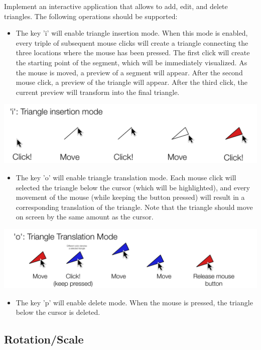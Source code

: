 \documentclass[11pt]{article}
\begin{document}
Implement an interactive application that allows to add, edit, and delete triangles. The following operations should be supported:
\begin{itemize}
	\item The key 'i' will enable triangle insertion mode. When this mode is enabled, every triple of subsequent mouse clicks will create a triangle connecting the three locations where the mouse has been pressed. The first click will create the starting point of the segment, which will be immediately visualized. As the mouse is moved, a preview of a segment will appear. After the second mouse click, a preview of the triangle will appear. After the third click, the current preview will transform into the final triangle. 
\end{itemize}
\includegraphics[width=1\textwidth]{i.pdf}
\begin{itemize}
	\item The key 'o' will enable triangle translation mode. Each mouse click will selected the triangle below the cursor (which will be highlighted), and every movement of the mouse (while keeping the button pressed) will result in a corresponding translation of the triangle. Note that the triangle should move on screen by the same amount as the cursor.
\end{itemize}
\includegraphics[width=1\textwidth]{o.pdf}
\begin{itemize}
	\item The key 'p' will enable delete mode. When the mouse is pressed, the triangle below the cursor is deleted.

\end{itemize}
\subsection{Rotation/Scale}
\end{document}
